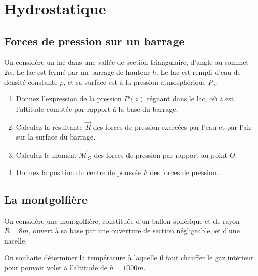 
\section{Hydrostatique}


\setcounter{subsection}{-1}
\subsection{Forces de pression sur un barrage}

 

On considère un lac dans une vallée de section triangulaire,
d'angle au sommet $2\alpha$.
Le lac est fermé par un barrage de hauteur 
$h$. Le lac est rempli
d'eau de densité constante $\rho$, et sa surface est à la pression 
atmosphérique $P_a$.


\begin{enumerate}

\item Donnez l'expression de la pression $P(z)$ régnant dans le lac, où $z$ est l'altitude 
comptée par rapport à la base du barrage.

\item Calculez la résultante $\vec R$ des forces de pression exercées par l'eau 
et par l'air sur la surface du barrage.

\item Calculez le moment $\vec{\mathcal M}_O$ des forces de pression par
rapport au point $O$.

\item Donnez la position du centre de poussée $F$ des forces de pression.

\end{enumerate}



\subsection{La montgolfière}

On considère une montgolfière, constituée d'un ballon sphérique et de 
rayon $R = 8m$, ouvert à sa base par une ouverture de section négligeable, et d'une nacelle.

On souhaite déterminer la température à laquelle il faut chauffer le gaz intérieur
pour pouvoir voler à l'altitude de $h=1000m$.

